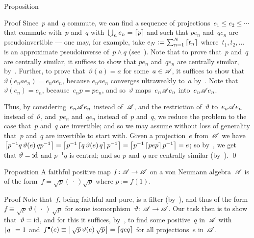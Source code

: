 \documentclass[a]{subfiles}
\begin{document}
\begin{parsec}
\begin{point}{Proposition}
\begin{point}{Proof}
Since~$p$ and~$q$ commute,
we can find a sequence
of projections~$e_1\leq e_2 \leq \dotsb$
that commute with~$p$ and~$q$
with~$\bigcup_n e_n =\left\lceil p\right\rceil$
and such that $pe_n$ and~$qe_n$
are pseudoinvertible --- one may,
for example,
take $e_N:=\sum_{n=1}^N \left\lceil t_n\right\rceil$
where~$t_1,t_2,\dotsc$
is an approximate pseudoinverse
of~$p\wedge q$ (see~).
Note that to prove that~$p$ and~$q$ are centrally similar,
it suffices to show that $pe_n$ and~$qe_n$ are centrally similar,
by~.
Further, to prove that~$\vartheta(a)=a$
for some~$a\in\mathscr{A}$,
it suffices to show that~$\vartheta( e_n a e_n  ) = e_n a e_n$,
because $e_n a e_n$ converges ultraweakly to~$a$
by~\TODO{}.
Note that~$\vartheta(e_n)=e_n$,
because~$e_np=pe_n$,
and so~$\vartheta$ maps~$e_n\mathscr{A} e_n$ into~$e_n \mathscr{A} e_n$.

Thus, by considering~$e_n \mathscr{A} e_n$ 
instead of~$\mathscr{A}$,
and the restriction of~$\vartheta$ to~$e_n\mathscr{A} e_n$
instead of~$\vartheta$,
and~$pe_n$ and~$qe_n$
instead of~$p$ and~$q$,
we reduce the problem to the case that~$p$ and~$q$ are invertible;
and so we may assume without loss of generality that~$p$ and~$q$
are invertible to start with.
Given a projection~$e$ from~$\mathscr{A}$
we have $\left\lceil p^{-1}q \,\vartheta(e)\, q p^{-1}\right\rceil
= \left\lceil p^{-1}\left\lceil q\,\vartheta(e)\,q\right\rceil p^{-1}\right\rceil
= \left\lceil p^{-1}\left\lceil pep\right\rceil p^{-1}\right\rceil=e$;
so 
by~,
we get that
$\vartheta=\operatorname{id}$
and
$p^{-1}q$ is central;
and so
$p$ and~$q$ are centrally similar (by~).
\qed
\end{point}
\end{point}
\begin{point}{Proposition}%
A faithful positive map $f\colon \mathscr{A}\to\mathscr{A}$
on a von Neumann algebra~$\mathscr{A}$
is of the form~$f=\sqrt{p}(\,\cdot\,)\sqrt{p}$
where $p:=f(1)$.
\begin{point}{Proof}%
Note that~$f$,
being faithful and pure,
is a filter
(by~),
and thus of the form $f\equiv \sqrt{p}\,\vartheta(\,\cdot\,)\,\sqrt{p}$
for some isomorphism~$\vartheta\colon \mathscr{A}\to\mathscr{A}$.
Our task then is to show that~$\vartheta=\operatorname{id}$,
and for this
it suffices, by~,
to find some positive~$q$ in~$\mathscr{A}$ with~$\left\lceil q\right\rceil=1$
and~$f^\bullet(e)\equiv\left\lceil\sqrt{p}\,\vartheta(e)\,\sqrt{p}\right\rceil
= \left\lceil qeq\right\rceil$ for all projections~$e$ in~$\mathscr{A}$.


\end{point}
\end{point}
\end{parsec}
\end{document}
